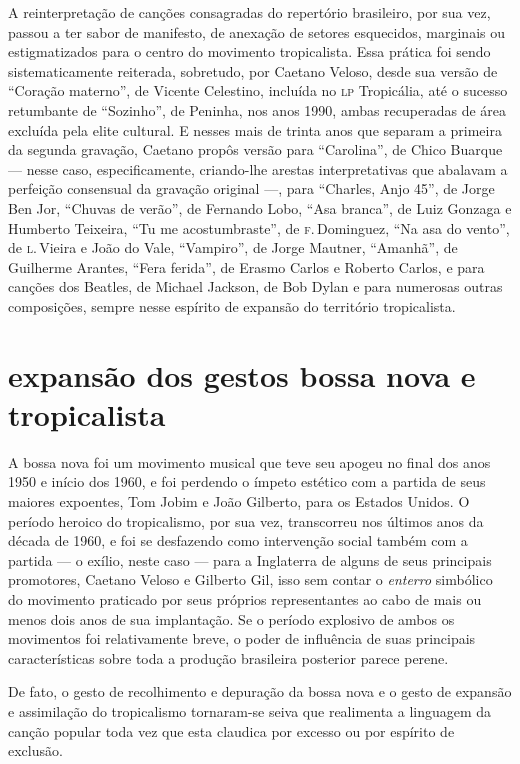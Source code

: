 A reinterpretação de canções consagradas do repertório brasileiro, por
sua vez, passou a ter sabor de manifesto, de anexação de setores
esquecidos, marginais ou estigmatizados para o centro do movimento
tropicalista. Essa prática foi sendo sistematicamente reiterada,
sobretudo, por Caetano Veloso, desde sua versão de ``Coração materno'', de Vicente Celestino, incluída no \textsc{lp} Tropicália, até o sucesso retumbante
de ``Sozinho'', de Peninha, nos anos 1990, ambas recuperadas de área
excluída pela elite cultural. E nesses mais de trinta anos que separam a
primeira da segunda gravação, Caetano propôs versão para ``Carolina'', de Chico Buarque --- nesse caso, especificamente, criando-lhe arestas
interpretativas que abalavam a perfeição consensual da gravação original
---, para ``Charles, Anjo 45'', de Jorge Ben Jor, ``Chuvas de verão'', de Fernando Lobo, ``Asa branca'', de Luiz Gonzaga e Humberto Teixeira, ``Tu
me acostumbraste'', de  \textsc{f}.\,Dominguez, ``Na asa do vento'', de \textsc{l}.\,Vieira e João
do Vale, ``Vampiro'', de Jorge Mautner, ``Amanhã'', de Guilherme Arantes,
``Fera ferida'', de Erasmo Carlos e Roberto Carlos, e para canções dos
Beatles, de Michael Jackson, de Bob Dylan e para numerosas outras
composições, sempre nesse espírito de expansão do território
tropicalista.

\section{expansão dos gestos bossa nova e tropicalista}

A bossa nova foi um movimento musical que teve seu apogeu no final dos
anos 1950 e início dos 1960, e foi perdendo o ímpeto estético com a
partida de seus maiores expoentes, Tom Jobim e João Gilberto, para os
Estados Unidos. O período heroico do tropicalismo, por sua vez,
transcorreu nos últimos anos da década de 1960, e foi se desfazendo como
intervenção social também com a partida --- o exílio, neste caso --- para a
Inglaterra de alguns de seus principais promotores, Caetano Veloso e
Gilberto Gil, isso sem contar o \textit{enterro} simbólico do movimento
praticado por seus próprios representantes ao cabo de mais ou menos dois
anos de sua implantação. Se o período explosivo de ambos os movimentos
foi relativamente breve, o poder de influência de suas principais
características sobre toda a produção brasileira posterior parece
perene.

De fato, o gesto de recolhimento e depuração da bossa nova e o gesto de
expansão e assimilação do tropicalismo tornaram-se seiva que realimenta
a linguagem da canção popular toda vez que esta claudica por excesso ou
por espírito de exclusão.

